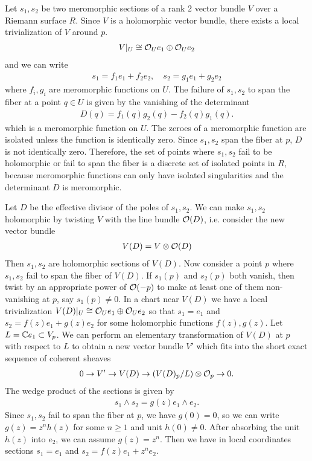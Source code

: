 \documentclass[12pt]{article}
\begin{document}
\begin{solution}
Let $s_1, s_2$ be two meromorphic sections of a rank 2 vector bundle $V$ over a Riemann surface $R$. Since $V$ is a holomorphic vector bundle, there exists a local trivialization of $V$ around $p$. \begin{align*}
        V|_U \cong {\mathcal{O}}_U e_1 \oplus {\mathcal{O}}_U e_2
    \end{align*} and we can write \begin{align*}
        s_1 = f_1 e_1 + f_2 e_2, \quad s_2 = g_1 e_1 + g_2 e_2
    \end{align*} where $f_i, g_i$ are meromorphic functions on $U$. The failure of $s_1, s_2$ to span the fiber at a point $q \in U$ is given by the vanishing of the determinant \begin{align*}
        D(q) = f_1(q)g_2(q) - f_2(q)g_1(q).
    \end{align*} which is a meromorphic function on $U$. The zeroes of a meromorphic function are isolated unless the function is identically zero. Since $s_1, s_2$ span the fiber at $p$, $D$ is not identically zero. Therefore, the set of points where $s_1, s_2$ fail to be holomorphic or fail to span the fiber is a discrete set of isolated points in $R$, because meromorphic functions can only have isolated singularities and the determinant $D$ is meromorphic.

    Let $D$ be the effective divisor of the poles of $s_1, s_2$. We can make $s_1, s_2$ holomorphic by twisting $V$ with the line bundle ${\mathcal{O}}(D)$, i.e. consider the new vector bundle \begin{align*}
        V(D) = V \otimes {\mathcal{O}}(D)\end{align*} Then $s_1, s_2$ are holomorphic sections of $V(D)$. Now consider a point $p$ where $s_1, s_2$ fail to span the fiber of $V(D)$. If $s_1(p)$ and $s_2(p)$ both vanish, then twist by an appropriate power of ${\mathcal{O}}(-p)$ to make at least one of them non-vanishing at $p$, say $s_1(p) \neq 0$. In a chart near $V(D)$ we have a local trivialization $V(D)|_U \cong {\mathcal{O}}_U e_1 \oplus {\mathcal{O}}_U e_2$ so that $s_1 = e_1$ and $s_2 = f(z)e_1 + g(z)e_2$ for some holomorphic functions $f(z), g(z)$. Let $L = \mathbb{C} e_1 \subset V_p$. We can perform an elementary transformation of $V(D)$ at $p$ with respect to $L$ to obtain a new vector bundle $V'$ which fits into the short exact sequence of coherent sheaves \begin{align}
        0 \to V' \to V(D) \to (V(D)_p/L) \otimes {\mathcal{O}}_p \to 0.
    \end{align} 
    The wedge product of the sections is given by \begin{align*}
        s_1 \wedge s_2 = g(z) e_1 \wedge e_2.
    \end{align*} Since $s_1, s_2$ fail to span the fiber at $p$, we have $g(0) = 0$, so we can write $g(z) = z^n h(z)$ for some $n \geq 1$ and unit $h(0) \neq 0$. After absorbing the unit $h(z)$ into $e_2$, we can assume $g(z) = z^n$. Then we have in local coordinates sections $s_1 = e_1$ and $s_2 = f(z) e_1 + z^n e_2$. 
    

\end{solution}
\end{document}
